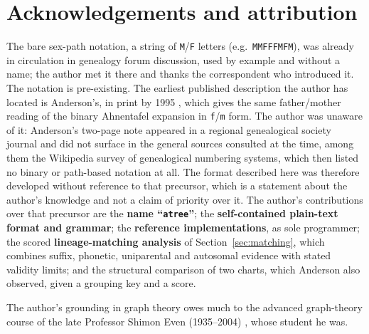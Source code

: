 \documentclass[11pt]{article}
\newcommand{\atree}{\texttt{atree}}
\begin{document}
\section*{Acknowledgements and attribution}
The bare sex-path notation, a string of \texttt{M}/\texttt{F} letters (e.g.\ \texttt{MMFFFMFM}), was
already in circulation in genealogy forum discussion, used by example and without a name; the author
met it there and thanks the correspondent who introduced it. The notation is pre-existing. The
earliest published description the author has located is Anderson's, in print by 1995
\cite{anderson1995}, which gives the same father/mother reading of the binary Ahnentafel expansion in
\texttt{f}/\texttt{m} form. The author was unaware of it: Anderson's two-page note appeared in a
regional genealogical society journal and did not surface in the general sources consulted at the
time, among them the Wikipedia survey of genealogical numbering systems, which then listed no binary
or path-based notation at all. The format described here was therefore developed without reference to
that precursor, which is a statement about the author's knowledge and not a claim of priority over
it. The author's contributions over that precursor are the \textbf{name ``\atree''}; the
\textbf{self-contained plain-text format and grammar}; the \textbf{reference implementations}, as
sole programmer; the scored \textbf{lineage-matching analysis} of Section~\ref{sec:matching}, which
combines suffix, phonetic, uniparental and autosomal evidence with stated validity limits; and the
structural comparison of two charts, which Anderson also observed, given a grouping key and a score.

The author's grounding in graph theory owes much to the advanced graph-theory course of the late
Professor Shimon Even (1935--2004) \cite{even_graph, even_comb}, whose student he was.
\end{document}
